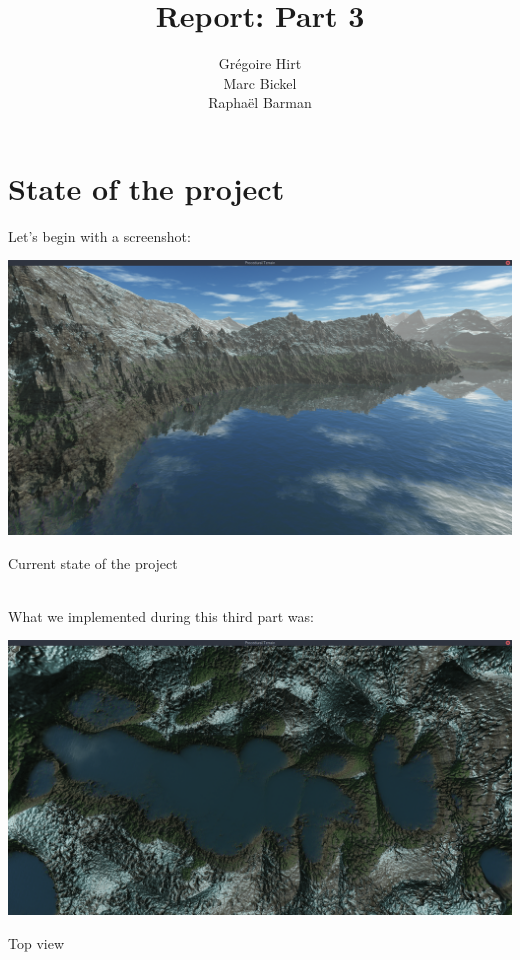 \documentclass[11pt]{article}
\begin{document}
\setlength{\parindent}{0pt}
%
\author{Grégoire Hirt\\ Marc Bickel\\ Raphaël Barman}
\title{\vspace{-2.0cm}Report: Part 3}
\maketitle
\vspace{-1cm}
\section{State of the project}
Let's begin with a screenshot:
\begin{center}
\includegraphics[width=\textwidth]{screen04}
\caption{Current state of the project}
\end{center} \\

What we implemented during this third part was:
\begin{itemize}
\end{itemize}

\begin{center}
\includegraphics[width=\textwidth]{screen05}
\caption{Top view}
\end{center} 
\end{document}
